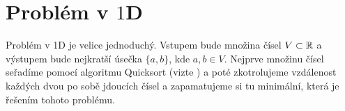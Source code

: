 \chapter{Problém v \texorpdfstring{$1$D}{1D}}
\label{chap:problem_1D}
Problém v 1D je velice jednoduchý. Vstupem bude množina čísel $V \subset \mathbb{R}$ a výstupem bude nejkratší úsečka $\{a, b\}$, kde $ a, b \in V$. Nejprve množinu čísel seřadíme pomocí algoritmu Quicksort (vizte \autocite{10.1093/comjnl/5.1.10}) a poté zkotrolujeme vzdálenost každých dvou po sobě jdoucích čísel a zapamatujeme si tu minimální, která je řešením tohoto problému.

